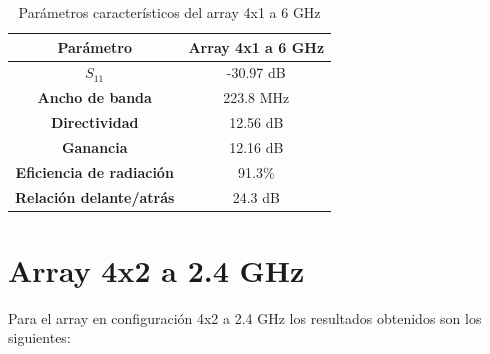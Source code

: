 \begin{table}[H]
  
   
   \small %
   \centering %
   \begin{tabular}{c c} %
   \toprule[\heavyrulewidth]\toprule[\heavyrulewidth]
   \textbf{Parámetro} & \textbf{Array 4x1 a 6 GHz} \\ 
   \midrule
   \textbf{$S_{11}$} & -30.97 dB \\
   \textbf{Ancho de banda} & 223.8 MHz \\
   \textbf{Directividad} & 12.56 dB \\
   \textbf{Ganancia} & 12.16 dB \\
   \textbf{Eficiencia de radiación} & 91.3\% \\
   \textbf{Relación delante/atrás} & 24.3 dB \\

   \bottomrule[\heavyrulewidth] 
   \end{tabular}
   
   \caption{Parámetros característicos del array 4x1 a 6 GHz} 
   \label{tab:res4x12}
\end{table}























\newpage
\section{Array 4x2 a 2.4 GHz}
\par Para el array en configuración 4x2 a 2.4 GHz los resultados obtenidos son los siguientes:

